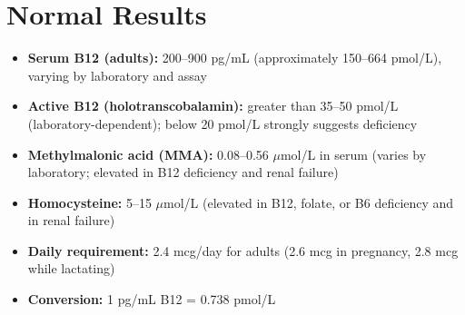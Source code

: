 \section*{Normal Results}
\begin{itemize}
  \item \textbf{Serum B12 (adults):} 200--900 pg/mL (approximately 150--664 pmol/L), varying by laboratory and assay
  \item \textbf{Active B12 (holotranscobalamin):} greater than 35--50 pmol/L (laboratory-dependent); below 20 pmol/L strongly suggests deficiency
  \item \textbf{Methylmalonic acid (MMA):} 0.08--0.56 $\mu$mol/L in serum (varies by laboratory; elevated in B12 deficiency and renal failure)
  \item \textbf{Homocysteine:} 5--15 $\mu$mol/L (elevated in B12, folate, or B6 deficiency and in renal failure)
  \item \textbf{Daily requirement:} 2.4 mcg/day for adults (2.6 mcg in pregnancy, 2.8 mcg while lactating)
  \item \textbf{Conversion:} 1 pg/mL B12 = 0.738 pmol/L
\end{itemize}

